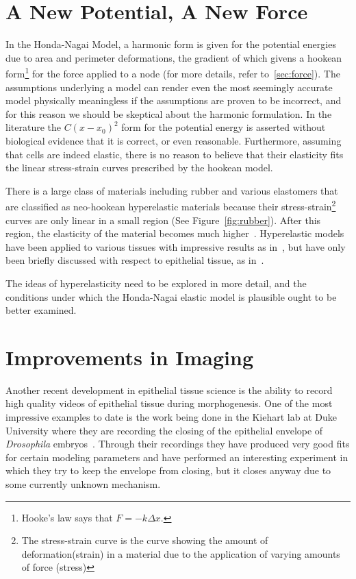 \section{A New Potential, A New Force}
In the Honda-Nagai Model, a harmonic form is given for the potential energies due to area and perimeter deformations, the gradient of which givens a hookean form\footnote{Hooke's law says that $F=-k\Delta x$.} for the force applied to a node (for more details, refer to~\ref{sec:force}). The assumptions underlying a model can render even the most seemingly accurate model physically meaningless if the assumptions are proven to be incorrect, and for this reason we should be skeptical about the harmonic formulation. In the literature the $C(x-x_0)^2$ form for the potential energy is asserted without biological evidence that it is correct, or even reasonable. Furthermore, assuming that cells are indeed elastic, there is no reason to believe that their elasticity fits the linear stress-strain curves prescribed by the hookean model.

There is a large class of materials including rubber and various elastomers that are classified as neo-hookean hyperelastic materials because their stress-strain\footnote{The stress-strain curve is the curve showing the amount of deformation(strain) in a material due to the application of varying amounts of force (stress)} curves are only linear in a small region (See Figure~\ref{fig:rubber}). After this region, the elasticity of the material becomes much higher~\cite{Rubber, Rubber2}. Hyperelastic models have been applied to various tissues with impressive results as in~\cite{hyperbio, hyperbio2}, but have only been briefly discussed with respect to epithelial tissue, as in~\cite{epihyper, epihyper2}.

The ideas of hyperelasticity need to be explored in more detail, and the conditions under which the Honda-Nagai elastic model is plausible ought to be better examined.

\section{Improvements in Imaging}
Another recent development in epithelial tissue science is the ability to record high quality videos of epithelial tissue during morphogenesis. One of the most impressive examples to date is the work being done in the Kiehart lab at Duke University where they are recording the closing of the epithelial envelope of \emph{Drosophila} embryos~\cite{Sokolow}. Through their recordings they have produced very good fits for certain modeling parameters and have performed an interesting experiment in which they try to keep the envelope from closing, but it closes anyway due to some currently unknown mechanism. 

